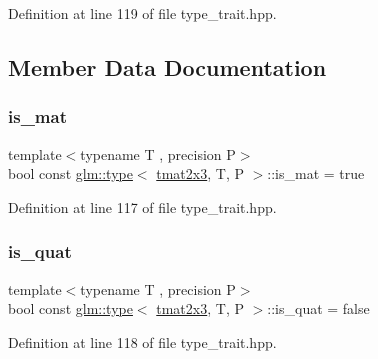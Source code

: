 Definition at line 119 of file type\+\_\+trait.\+hpp.



\subsection{Member Data Documentation}
\mbox{\label{structglm_1_1type_3_01tmat2x3_00_01_t_00_01_p_01_4_a6ab5d376d2ef7072813e3836fc9ccf95}} 
\subsubsection{\texorpdfstring{is\_mat}{is\_mat}}
{\footnotesize\ttfamily template$<$typename T , precision P$>$ \\
bool const \mbox{\hyperlink{structglm_1_1type}{glm\+::type}}$<$ \mbox{\hyperlink{structglm_1_1tmat2x3}{tmat2x3}}, T, P $>$\+::is\+\_\+mat = true\hspace{0.3cm}{\ttfamily [static]}}



Definition at line 117 of file type\+\_\+trait.\+hpp.

\mbox{\label{structglm_1_1type_3_01tmat2x3_00_01_t_00_01_p_01_4_a2d2bbd03e889bb34375c236c196af7c4}} 
\subsubsection{\texorpdfstring{is\_quat}{is\_quat}}
{\footnotesize\ttfamily template$<$typename T , precision P$>$ \\
bool const \mbox{\hyperlink{structglm_1_1type}{glm\+::type}}$<$ \mbox{\hyperlink{structglm_1_1tmat2x3}{tmat2x3}}, T, P $>$\+::is\+\_\+quat = false\hspace{0.3cm}{\ttfamily [static]}}



Definition at line 118 of file type\+\_\+trait.\+hpp.

\mbox{\label{structglm_1_1type_3_01tmat2x3_00_01_t_00_01_p_01_4_aaf1b59c556fe102c644d35df40e27dda}} 
